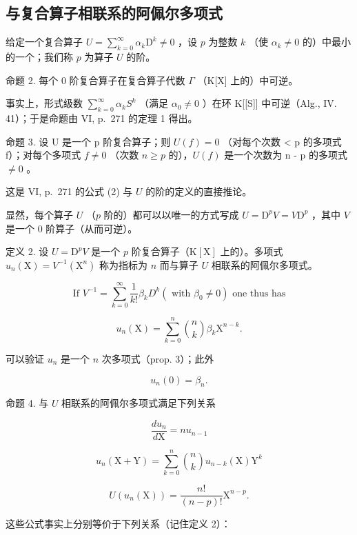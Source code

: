 \subsection{与复合算子相联系的阿佩尔多项式}

给定一个复合算子 \(U = \sum_{k=0}^{\infty} \alpha_k \mathrm{D}^k \neq 0\) ，设 \(p\) 为整数 \(k\) （使 \(\alpha_k \neq 0\) 的）中最小的一个；我们称 \(p\) 为算子 \(U\) 的阶。

命题 2. 每个 0 阶复合算子在复合算子代数 \(\Gamma\) （K{[}X{]} 上的）中可逆。

事实上，形式级数 \(\sum_{k=0}^{\infty}\alpha_{k}S^{k}\) （满足 \(\alpha_{0}\neq0\) ）在环 K{[}{[}S{]}{]} 中可逆（Alg., IV. 41）；于是命题由 VI, p.~271 的定理 1 得出。

命题 3. 设 U 是一个 p 阶复合算子；则 \(U(f) = 0\) （对每个次数 \textless{} p 的多项式 f）；对每个多项式 \(f \neq 0\) （次数 \(n \geqslant p\) 的），\(U(f)\) 是一个次数为 n - p 的多项式 \(\neq 0\) 。

这是 VI, p.~271 的公式 (2) 与 \(U\) 的阶的定义的直接推论。

显然，每个算子 \(U\) （\(p\) 阶的）都可以以唯一的方式写成 \(U = \mathrm{D}^p V = V\mathrm{D}^p\) ，其中 \(V\) 是一个 0 阶算子（从而可逆）。

定义 2. 设 \(U = \mathrm{D}^p V\) 是一个 \(p\) 阶复合算子（\(\mathrm{K}[\mathrm{X}]\) 上的）。多项式 \(u_n(\mathrm{X}) = V^{-1}(\mathrm{X}^n)\) 称为指标为 \(n\) 而与算子 \(U\) 相联系的阿佩尔多项式。

\[
\text {   If   } V ^ {- 1} = \sum_ {k = 0} ^ {\infty} \frac {1}{k !} \beta_ {k} D ^ {k} (\text {   with   } \beta_ {0} \neq 0) \text {   one   thus   has   }
\]

\[
u _ {n} (\mathrm{X}) = \sum_ {k = 0} ^ {n} {\binom {n} {k}} \beta_ {k}   \mathrm{X} ^ {n - k}.\tag{6}
\]

可以验证 \(u_{n}\) 是一个 \(n\) 次多项式（prop. 3）；此外

\[
u _ {n} (0) = \beta_ {n}.
\]

命题 4. 与 \(U\) 相联系的阿佩尔多项式满足下列关系

\[
\frac {d u _ {n}}{d \mathrm{X}} = n u _ {n - 1}\tag{7}
\]

\[
u _ {n} (\mathrm{X} + \mathrm{Y}) = \sum_ {k = 0} ^ {n} {\binom {n} {k}} u _ {n - k} (\mathrm{X})   \mathrm{Y} ^ {k}\tag{8}
\]

\[
U \left(u _ {n} (\mathrm{X})\right) = \frac {n !}{(n - p) !} \mathrm{X} ^ {n - p}.\tag{9}
\]

这些公式事实上分别等价于下列关系（记住定义 2）：

